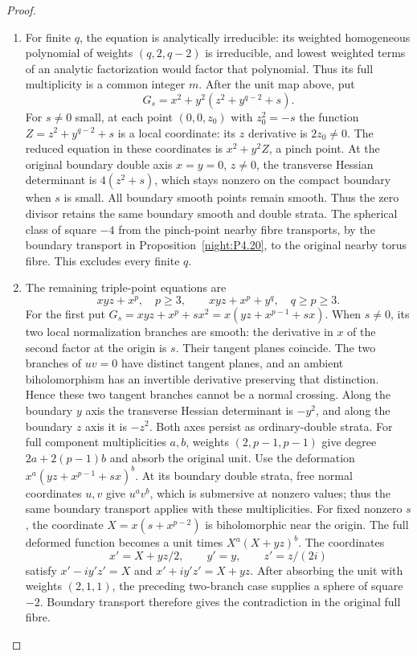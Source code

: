 \begin{proof}
\begin{enumerate}[label={$\langle1\rangle$\arabic*.},leftmargin=*]
\item For finite $q$, the equation is analytically irreducible:
its weighted homogeneous polynomial of weights $(q,2,q-2)$ is
irreducible, and lowest weighted terms of an analytic factorization
would factor that polynomial. Thus its full multiplicity is a common
integer $m$. After the unit map above, put
\[
 G_s=x^2+y^2(z^2+y^{q-2}+s).
\]
For $s\ne0$ small, at each point
$(0,0,z_0)$ with $z_0^2=-s$ the function
$Z=z^2+y^{q-2}+s$ is a local coordinate:
its $z$ derivative is $2z_0\ne0$.
The reduced equation in these coordinates is
$x^2+y^2Z$, a pinch point. At the original
boundary double axis $x=y=0$, $z\ne0$,
the transverse Hessian determinant is
$4(z^2+s)$, which stays nonzero on the
compact boundary when $s$ is small.
All boundary smooth points remain smooth.
Thus the zero divisor retains the same
boundary smooth and double strata.
The spherical class of square $-4$
from the pinch-point nearby fibre transports,
by the boundary transport in Proposition~\ref{night:P4.20}, to
the original nearby torus fibre.
This excludes every finite $q$.

\item The remaining triple-point equations are
\[
 xyz+x^p,\quad p\ge3,\qquad
 xyz+x^p+y^q,\quad q\ge p\ge3.
\]
For the first put
$G_s=xyz+x^p+s x^2
=x(yz+x^{p-1}+s x)$.
When $s\ne0$, its two local normalization
branches are smooth: the derivative in $x$
of the second factor at the origin is $s$.
Their tangent planes coincide. The two branches of $uv=0$ have
distinct tangent planes, and an ambient biholomorphism has an invertible
derivative preserving that distinction. Hence these two tangent branches
cannot be a normal crossing. Along
the boundary $y$ axis the transverse
Hessian determinant is $-y^2$, and along
the boundary $z$ axis it is $-z^2$.
Both axes persist as ordinary-double
strata. For full component multiplicities $a,b$, weights $(2,p-1,p-1)$
give degree $2a+2(p-1)b$ and absorb the original unit. Use the deformation
$x^a(yz+x^{p-1}+sx)^b$. At its boundary double strata, free normal
coordinates $u,v$ give $u^av^b$, which is submersive at nonzero
values; thus the same boundary transport applies with these multiplicities.
For fixed nonzero $s$, the coordinate $X=x(s+x^{p-2})$ is
biholomorphic near the origin. The full deformed function becomes
a unit times $X^a(X+yz)^b$. The coordinates
\[
 x'=X+yz/2,\qquad y'=y,\qquad z'=z/(2i)
\]
satisfy $x'-iy'z'=X$ and $x'+iy'z'=X+yz$.
After absorbing the unit with weights $(2,1,1)$, the preceding
two-branch case supplies a sphere of square $-2$. Boundary transport
therefore gives the contradiction in the original full fibre.


\end{enumerate}
\end{proof}
